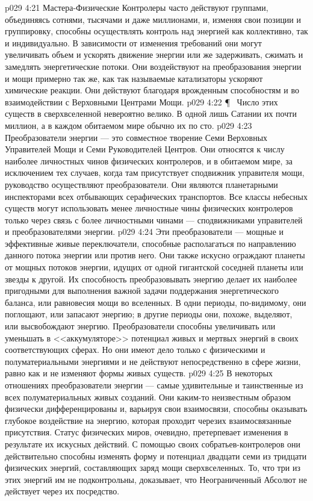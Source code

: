 \vs p029 4:21 Мастера\hyp{}Физические Контролеры часто действуют группами, объединяясь сотнями, тысячами и даже миллионами, и, изменяя свои позиции и группировку, способны осуществлять контроль над энергией как коллективно, так и индивидуально. В зависимости от изменения требований они могут увеличивать объем и ускорять движение энергии или же задерживать, сжимать и замедлять энергетические потоки. Они воздействуют на преобразования энергии и мощи примерно так же, как так называемые катализаторы ускоряют химические реакции. Они действуют благодаря врожденным способностям и во взаимодействии с Верховными Центрами Мощи.
\vs p029 4:22 \P\ \bibnobreakspace {} Число этих существ в сверхвселенной невероятно велико. В одной лишь Сатании их почти миллион, а в каждом обитаемом мире обычно их по сто.
\vs p029 4:23 Преобразователи энергии --- это совместное творение Семи Верховных Управителей Мощи и Семи Руководителей Центров. Они относятся к числу наиболее личностных чинов физических контролеров, и в обитаемом мире, за исключением тех случаев, когда там присутствует сподвижник управителя мощи, руководство осуществляют преобразователи. Они являются планетарными инспекторами всех отбывающих серафических транспортов. Все классы небесных существ могут использовать менее личностные чины физических контролеров только через связь с более личностными чинами --- сподвижниками управителей и преобразователями энергии.
\vs p029 4:24 Эти преобразователи --- мощные и эффективные живые переключатели, способные располагаться по направлению данного потока энергии или против него. Они также искусно ограждают планеты от мощных потоков энергии, идущих от одной гигантской соседней планеты или звезды к другой. Их способность преобразовывать энергию делает их наиболее пригодными для выполнения важной задачи поддержания энергетического баланса, или равновесия мощи во вселенных. В одни периоды, по\hyp{}видимому, они поглощают, или запасают энергию; в другие периоды они, похоже, выделяют, или высвобождают энергию. Преобразователи способны увеличивать или уменьшать в <<аккумуляторе>> потенциал живых и мертвых энергий в своих соответствующих сферах. Но они имеют дело только с физическими и полуматериальными энергиями и не действуют непосредственно в сфере жизни, равно как и не изменяют формы живых существ.
\vs p029 4:25 В некоторых отношениях преобразователи энергии --- самые удивительные и таинственные из всех полуматериальных живых созданий. Они каким\hyp{}то неизвестным образом физически дифференцированы и, варьируя свои взаимосвязи, способны оказывать глубокое воздействие на энергию, которая проходит черезих взаимосвязанные присутствия. Статус физических миров, очевидно, претерпевает изменения в результате их искусных действий.  С помощью своих собратьев\hyp{}контролеров они действительно способны изменять форму и потенциал двадцати семи из тридцати физических энергий, составляющих заряд мощи сверхвселенных. То, что три из этих энергий им не подконтрольны, доказывает, что Неограниченный Абсолют не действует через их посредство.
